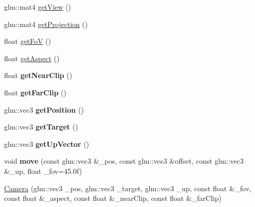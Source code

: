 \begin{DoxyCompactItemize}
\item 
glm\-::mat4 \hyperlink{class_swift_1_1_camera_a6fb94d155749b0169ef2ed79302ad414}{get\-View} ()
\item 
glm\-::mat4 \hyperlink{class_swift_1_1_camera_a56f048c36a97568a52f1ac56a76f28b9}{get\-Projection} ()
\item 
float \hyperlink{class_swift_1_1_camera_a44dd87522fbf1373d27a75a5118ded1f}{get\-Fo\-V} ()
\item 
float \hyperlink{class_swift_1_1_camera_ab1d5d6f54d38bd4a1ed634b8ddbaaeb8}{get\-Aspect} ()
\item 
\hypertarget{class_swift_1_1_camera_a2516e737315e7baa9be4cc2f3d5d89f2}{float {\bfseries get\-Near\-Clip} ()}\label{class_swift_1_1_camera_a2516e737315e7baa9be4cc2f3d5d89f2}

\item 
\hypertarget{class_swift_1_1_camera_a671fcaedeb7403344be02cba61e07828}{float {\bfseries get\-Far\-Clip} ()}\label{class_swift_1_1_camera_a671fcaedeb7403344be02cba61e07828}

\item 
\hypertarget{class_swift_1_1_camera_af7ece7b2345142287ebb8f44c9bfc4e8}{glm\-::vec3 {\bfseries get\-Position} ()}\label{class_swift_1_1_camera_af7ece7b2345142287ebb8f44c9bfc4e8}

\item 
\hypertarget{class_swift_1_1_camera_a81a20875b877e888eb4303cdd921e648}{glm\-::vec3 {\bfseries get\-Target} ()}\label{class_swift_1_1_camera_a81a20875b877e888eb4303cdd921e648}

\item 
\hypertarget{class_swift_1_1_camera_a444610e566bcf79edae4431142ac1840}{glm\-::vec3 {\bfseries get\-Up\-Vector} ()}\label{class_swift_1_1_camera_a444610e566bcf79edae4431142ac1840}

\item 
\hypertarget{class_swift_1_1_camera_a8a1b0e633e0325d30b44f473b8c88f87}{void {\bfseries move} (const glm\-::vec3 \&\-\_\-pos, const glm\-::vec3 \&offset, const glm\-::vec3 \&\-\_\-up, float \-\_\-fov=45.\-0f)}\label{class_swift_1_1_camera_a8a1b0e633e0325d30b44f473b8c88f87}

\item 
\hyperlink{class_swift_1_1_camera_a2670e9e2fd99c38790b92e568bbadfda}{Camera} (glm\-::vec3 \-\_\-pos, glm\-::vec3 \-\_\-target, glm\-::vec3 \-\_\-up, const float \&\-\_\-fov, const float \&\-\_\-aspect, const float \&\-\_\-near\-Clip, const float \&\-\_\-far\-Clip)
\end{DoxyCompactItemize}


